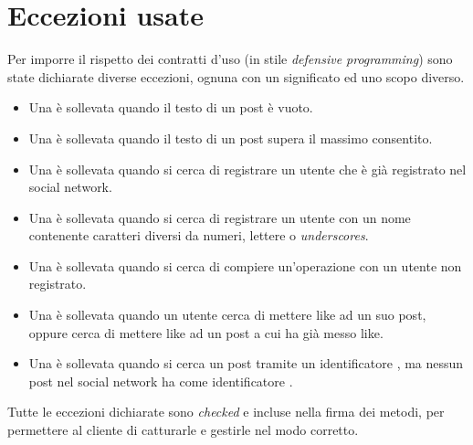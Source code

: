 \section{Eccezioni usate}
\label{sec:exceptions}

Per imporre il rispetto dei contratti d'uso (in stile \emph{defensive programming}) sono state dichiarate diverse eccezioni, ognuna con un significato ed uno scopo diverso.
\begin{itemize}
    \item Una  è sollevata quando il testo di un post è vuoto.
    \item Una  è sollevata quando il testo di un post supera il massimo consentito.
    \item Una  è sollevata quando si cerca di registrare un utente che è già registrato nel social network.
    \item Una  è sollevata quando si cerca di registrare un utente con un nome contenente caratteri diversi da numeri, lettere o \emph{underscores}.
    \item Una  è sollevata quando si cerca di compiere un'operazione con un utente non registrato.
    \item Una  è sollevata quando un utente cerca di mettere like ad un suo post, oppure cerca di mettere like ad un post a cui ha già messo like.
    \item Una  è sollevata quando si cerca un post tramite un identificatore , ma nessun post nel social network ha come identificatore .
\end{itemize}

Tutte le eccezioni dichiarate sono \emph{checked} e incluse nella firma dei metodi, per permettere al cliente di catturarle e gestirle nel modo corretto.